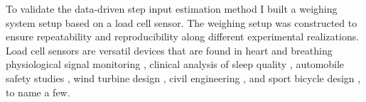 To validate the data-driven step input estimation method I built a weighing system setup based on a load cell sensor.
The weighing setup was constructed to ensure repeatability and reproducibility along different experimental realizations.
Load cell sensors are versatil devices that are found in 
heart and breathing physiological signal monitoring \citep{Lee16},
clinical analysis of sleep quality \citep{Zahradka18},
automobile safety studies \citep{Ballo16},
wind turbine design \citep{Rossander15}, 
civil engineering \citep{Olmi16}, and 
sport bicycle design \citep{Casas16}, to name a few.


\begin{comment}
Weighing has been basic for the development of scientific and trade activites. 
The load cell is now a standard transducer for weight determination and also for the improvement of measurement techniques, such as the geometric approach to processing of load cell responses \citep{Kesilmis16}, the design of new conveyor machinery \citep{Yamani18}, and electronic truck scales \citep{Guo18}.

In safety studies, a six axis load cell is devised to quantify accelerations and impact forces exerted on a dummy \citep{Ballo16}.
In alternative energy developments the load cells are useful to measure the forces on the arms of a vertical axis wind turbine \citep{Rossander15}.
An academic study of the load that a structure withstands is conducted with strain gage load cells that confirms the numerical results and facilitates the design of complex shaped structures \citep{Olmi16}.
In sports, the performance of new instrumented crank mechanisms is fostered by the utilization of load cells in the characterization, analysis and validation design stages \citep{Casas16}.

The versatility of the load cells permits the physiological signal monitoring of the the heart and breathing rates \citep{Lee16}, clinical analysis of sleep quality \citep{Zahradka18} and the classification of the movement intensity of people while they are sleeping \citep{Alaziz17}. 
All of these experimental studies have load cells installed on bed setups.


%
An extension of the methodology proposed for the data-driven step input estimation was formulated to estimate the parameters of an affine input that changes at a constant rate,  by signal processing of the sensor transient response.
This type of ramp inputs is observed in the measurement of mass during the transportation of products on conveyor systems, ranging from few grams \citep{Burmen09} to almost hundreds of kilograms \citep{Tasaki07}.
The data-driven affine input estimation method is proposed as an alternative to existing compensation filters, such as 
the time-variant low-pass filters introduced in \citep{Piskorowski08, Pietrzak14}, and
the combination of filters in cascade proposed in \citep{Niedzwiecki16a}.
\end{comment}


